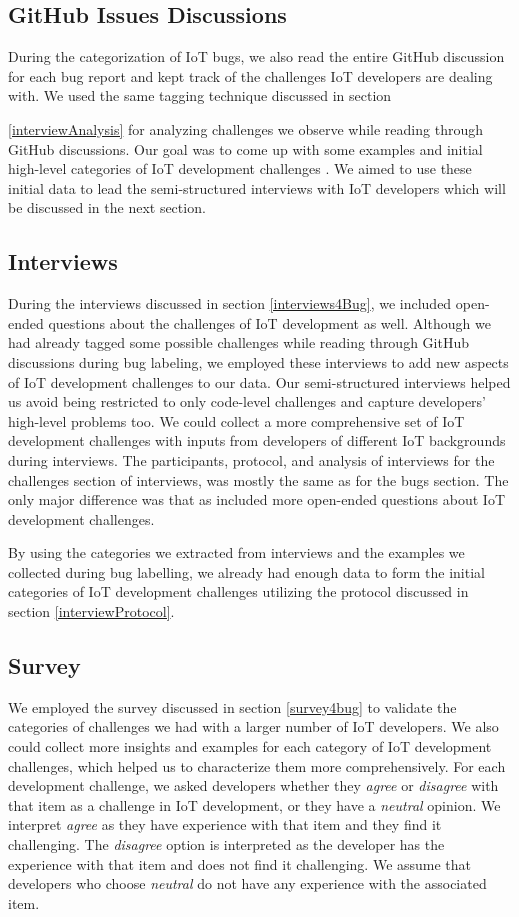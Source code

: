 \subsection{GitHub Issues Discussions}
During the categorization of IoT bugs, we also read the entire GitHub discussion for each bug report and kept track of the challenges IoT developers are dealing with. We used the same tagging technique discussed in section {\autoref{interviewAnalysis} for analyzing challenges we observe while reading through GitHub discussions. Our goal was to come up with some examples and initial high-level categories of IoT development challenges . We aimed to use these initial data to lead the semi-structured interviews with IoT developers which will be discussed in the next section.


\subsection{Interviews}
During the interviews discussed in section \autoref{interviews4Bug}, we included open-ended questions about the challenges of IoT development as well. Although we had already tagged some possible challenges while reading through GitHub discussions during bug labeling, we employed these interviews to add new aspects of IoT development challenges to our data. Our semi-structured interviews helped us avoid being restricted to only code-level challenges and capture developers' high-level problems too. We could collect a more comprehensive set of IoT development challenges with inputs from developers of different IoT backgrounds during interviews. The participants, protocol, and analysis of interviews for the challenges section of interviews, was mostly the same as for the bugs section. The only major difference was that as included more open-ended questions about IoT development challenges. 

By using the categories we extracted from interviews and the examples we collected during bug labelling, we already had enough data to form the initial categories of IoT development challenges utilizing the protocol discussed in section \autoref{interviewProtocol}. 

\subsection{Survey}
We employed the survey discussed in section \autoref{survey4bug}  to validate the categories of challenges we had with a larger number of IoT developers. We also could collect more insights and examples for each category of IoT development challenges, which helped us to characterize them more comprehensively. For each development challenge, we asked developers whether they \textit{agree} or \textit{disagree} with that item as a challenge in IoT development, or they have a \textit{neutral} opinion. We interpret \textit{agree} as they have experience with that item and they find it challenging. The \textit{disagree} option is interpreted as the developer has the experience with that item and does not find it challenging. We assume that developers who choose \textit{neutral} do not have any experience with the associated item. 


}
